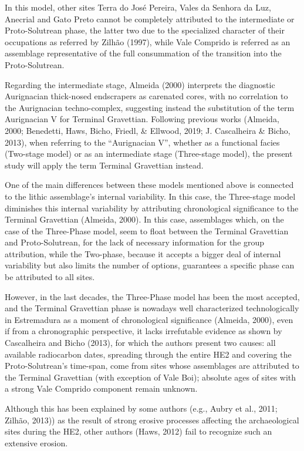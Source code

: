 \documentclass[12pt,twoside]{reedthesis}
\begin{document}
In this model, other sites Terra do José Pereira, Vales da Senhora da Luz, Anecrial and Gato Preto cannot be completely attributed to the intermediate or Proto-Solutrean phase, the latter two due to the specialized character of their occupations as referred by Zilhão (1997), while Vale Comprido is referred as an assemblage representative of the full consummation of the transition into the Proto-Solutrean.

Regarding the intermediate stage, Almeida (2000) interprets the diagnostic Aurignacian thick-nosed endscrapers as carenated cores, with no correlation to the Aurignacian techno-complex, suggesting instead the substitution of the term Aurignacian V for Terminal Gravettian. Following previous works (Almeida, 2000; Benedetti, Haws, Bicho, Friedl, \& Ellwood, 2019; J. Cascalheira \& Bicho, 2013), when referring to the ``Aurignacian V'', whether as a functional facies (Two-stage model) or as an intermediate stage (Three-stage model), the present study will apply the term Terminal Gravettian instead.

One of the main differences between these models mentioned above is connected to the lithic assemblage's internal variability. In this case, the Three-stage model diminishes this internal variability by attributing chronological significance to the Terminal Gravettian (Almeida, 2000). In this case, assemblages which, on the case of the Three-Phase model, seem to float between the Terminal Gravettian and Proto-Solutrean, for the lack of necessary information for the group attribution, while the Two-phase, because it accepts a bigger deal of internal variability but also limits the number of options, guarantees a specific phase can be attributed to all sites.

However, in the last decades, the Three-Phase model has been the most accepted, and the Terminal Gravettian phase is nowadays well characterized technologically in Estremadura as a moment of chronological significance (Almeida, 2000), even if from a chronographic perspective, it lacks irrefutable evidence as shown by Cascalheira and Bicho (2013), for which the authors present two causes: all available radiocarbon dates, spreading through the entire HE2 and covering the Proto-Solutrean's time-span, come from sites whose assemblages are attributed to the Terminal Gravettian (with exception of Vale Boi); absolute ages of sites with a strong Vale Comprido component remain unknown.

Although this has been explained by some authors (e.g., Aubry et al., 2011; Zilhão, 2013)) as the result of strong erosive processes affecting the archaeological sites during the HE2, other authors (Haws, 2012) fail to recognize such an extensive erosion.
\end{document}
